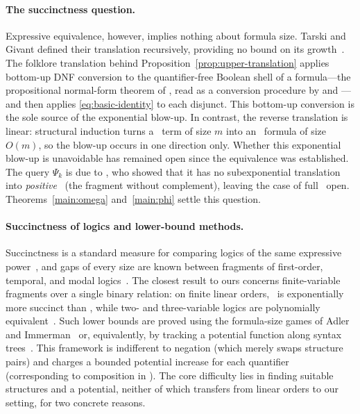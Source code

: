 \paragraph{The succinctness question.}
Expressive equivalence, however, implies nothing about formula size. Tarski
and Givant defined their translation recursively, providing no bound on its
growth~\citep[\S3.9]{tarski-givant1987}. The folklore translation behind
Proposition~\ref{prop:upper-translation} applies bottom-up DNF conversion to
the quantifier-free Boolean shell of a formula---the propositional normal-form
theorem of \citet{hilbert-ackermann1928}, read as a conversion procedure by
\citet{kleene1952} and \citet{schoening1989}---and then applies
\eqref{eq:basic-identity} to each disjunct. This bottom-up conversion is
the sole source of the exponential blow-up. In contrast, the reverse
translation is linear: structural induction turns a \CoR\ term of size $m$
into an \FOthree\ formula of size $O(m)$, so the blow-up occurs in one
direction only. Whether this exponential blow-up is unavoidable has remained
open since the equivalence was established. The query $\Psi_k$ is due to
\citet{nakamura2022}, who showed that it has no subexponential translation
into \emph{positive} \CoR\ (the fragment without complement), leaving the
case of full \CoR\ open. Theorems~\ref{main:omega} and~\ref{main:phi} settle
this question.

\paragraph{Succinctness of logics and lower-bound methods.}
Succinctness is a standard measure for comparing logics of the same
expressive power~\citep{grohe-schweikardt2005}, and gaps of every size are
known between fragments of first-order, temporal, and modal
logics~\citep{etessami-vardi-wilke2002,adler-immerman2003,dawar2007,french2013}.
The closest result to ours concerns finite-variable fragments over a
single binary relation: on finite linear orders, \FOfour\ is
exponentially more succinct than \FOthree, while two- and three-variable
logics are polynomially equivalent~\citep{grohe-schweikardt2005}. Such lower
bounds are proved using the formula-size games of Adler and
Immerman~\citep{adler-immerman2003,hella-vilander2019} or, equivalently, by
tracking a potential function along syntax trees~\citep{grohe-schweikardt2005}.
This framework is indifferent to negation (which merely swaps structure pairs)
and charges a bounded potential increase for each quantifier (corresponding
to composition in \CoR). The core difficulty lies in finding suitable
structures and a potential, neither of which transfers from linear orders to
our setting, for two concrete reasons.

